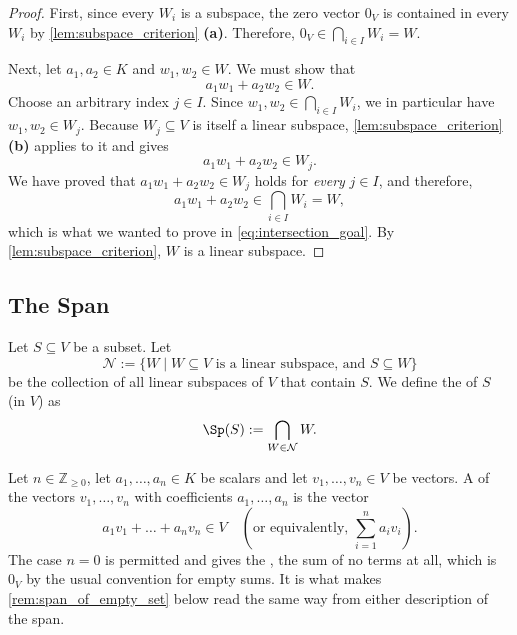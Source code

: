 \begin{proof}
First, since every $W_i$ is a subspace, the zero vector $0_V$ is contained in every $W_i$ by \cref{lem:subspace_criterion} \textbf{(a)}. Therefore, $0_V \in \bigcap_{i \in I} W_i = W$.

Next, let $a_1, a_2 \in K$ and $w_1, w_2 \in W$. We must show that
\begin{equation} \label{eq:intersection_goal}
a_1 w_1 + a_2 w_2 \in W.
\end{equation}
Choose an arbitrary index $j \in I$. Since $w_1, w_2 \in \bigcap_{i \in I} W_i$, we in particular have $w_1, w_2 \in W_j$. Because $W_j \subseteq V$ is itself a linear subspace, \cref{lem:subspace_criterion} \textbf{(b)} applies to it and gives
\[
a_1 w_1 + a_2 w_2 \in W_j.
\]
We have proved that $a_1 w_1 + a_2 w_2 \in W_j$ holds for \emph{every} $j \in I$, and therefore,
\[
a_1 w_1 + a_2 w_2 \in \bigcap_{i \in I} W_i = W,
\]
which is what we wanted to prove in \eqref{eq:intersection_goal}. By \cref{lem:subspace_criterion}, $W$ is a linear subspace.
\end{proof}

\subsection{The Span}

\begin{definition}[Span]
\label{def:span}
Let $S \subseteq V$ be a subset. Let
\[
\mathcal{N} := \{W \mid W \subseteq V \text{ is a linear subspace, and } S \subseteq W\}
\]
be the collection of all linear subspaces of $V$ that contain $S$. We define the  of $S$ (in $V$) as
\[
\Sp(S) := \bigcap_{W \in \mathcal{N}} W.
\]
\end{definition}

\begin{definition}
\label{def:linear_combination}
Let $n \in \mathbb{Z}_{\ge 0}$, let $a_1, \dots, a_n \in K$ be scalars and let $v_1, \dots, v_n \in V$ be vectors. A  of the vectors $v_1, \dots, v_n$ with coefficients $a_1, \dots, a_n$ is the vector
\[
a_1 v_1 + \dots + a_n v_n \in V \quad \left(\text{or equivalently, } \sum_{i=1}^n a_i v_i\right).
\]
The case $n = 0$ is permitted and gives the , the sum of no terms at all, which is $0_V$ by the usual convention for empty sums. It is what makes \cref{rem:span_of_empty_set} below read the same way from either description of the span.
\end{definition}


